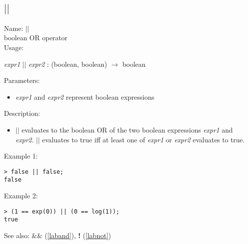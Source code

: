 \subsection{$||$}
\label{labor}
\noindent Name: \textbf{$||$}\\
boolean OR operator\\
\noindent Usage: 
\begin{center}
\emph{expr1} \textbf{$||$} \emph{expr2} : (\textsf{boolean}, \textsf{boolean}) $\rightarrow$ \textsf{boolean}\\
\end{center}
Parameters: 
\begin{itemize}
\item \emph{expr1} and \emph{expr2} represent boolean expressions
\end{itemize}
\noindent Description: \begin{itemize}

\item \textbf{$||$} evaluates to the boolean OR of the two
   boolean expressions \emph{expr1} and \emph{expr2}. \textbf{$||$} evaluates to 
   true iff at least one of \emph{expr1} or \emph{expr2} evaluates to true.
\end{itemize}
\noindent Example 1: 
\begin{center}\begin{minipage}{15cm}\begin{Verbatim}[frame=single]
> false || false;
false
\end{Verbatim}
\end{minipage}\end{center}
\noindent Example 2: 
\begin{center}\begin{minipage}{15cm}\begin{Verbatim}[frame=single]
> (1 == exp(0)) || (0 == log(1));
true
\end{Verbatim}
\end{minipage}\end{center}
See also: \textbf{$\&\&$} (\ref{laband}), \textbf{!} (\ref{labnot})
